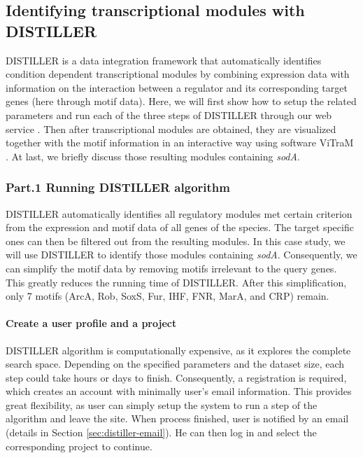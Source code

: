 \subsection{Identifying transcriptional modules with DISTILLER}

DISTILLER \cite{Lemmens2009} is a data integration framework that automatically identifies condition dependent transcriptional modules by combining expression data with information on the interaction between a regulator and its corresponding target genes (here through motif data). Here, we will first show how to setup the related parameters and run each of the three steps of DISTILLER through our web service \cite{DISTILLER}. Then after transcriptional modules are obtained, they are visualized together with the motif information in an interactive way using software ViTraM \cite{Sun2009}. At last, we briefly discuss those resulting modules containing \textit{sodA}.

\subsubsection{Part.1 Running DISTILLER algorithm}\label{sec:dist-distmodule}

DISTILLER automatically identifies all regulatory modules met certain criterion from the expression and motif data of all genes of the species. The target specific ones can then be filtered out from the resulting modules. In this case study, we will use DISTILLER to identify those modules containing \textit{sodA}. Consequently, we can simplify the motif data by removing motifs irrelevant to the query genes.  This greatly reduces the running time of DISTILLER.  After this simplification, only 7 motifs (ArcA, Rob, SoxS, Fur, IHF, FNR, MarA, and CRP) remain.



\paragraph{Create a user profile and a project}
DISTILLER algorithm is computationally expensive, as it explores the complete search space. Depending on the specified parameters and the dataset size, each step could take hours or days to finish.   Consequently, a registration is required, which creates an account with minimally user's email information.  This provides great flexibility, as user can simply setup the system to run a step of the algorithm and leave the site. When process finished, user is notified by an email (details in Section \ref{sec:distiller-email}).  He can then log in and select the corresponding project to continue.



